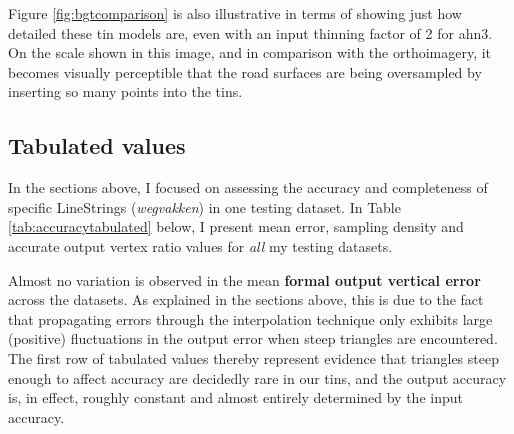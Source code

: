 Figure \ref{fig:bgtcomparison} is also illustrative in terms of showing just how detailed these \ac{tin} models are, even with an input thinning factor of 2 for \ac{ahn3}. On the scale shown in this image, and in comparison with the orthoimagery, it becomes visually perceptible that the road surfaces are being oversampled by inserting so many points into the \ac{tin}s.

\subsection{Tabulated values}
\label{sub:accuracytabulated}

In the sections above, I focused on assessing the accuracy and completeness of specific LineStrings (\textit{wegvakken}) in one testing dataset. In Table \ref{tab:accuracytabulated} below, I present mean error, sampling density and accurate output vertex ratio values for \textit{all} my testing datasets.

\begin{table}
    \caption{Tabulated 3D-NWB accuracy and completeness results per testing dataset.
    \label{tab:accuracytabulated}}
\end{table}

Almost no variation is observed in the mean \textbf{formal output vertical error} across the datasets. As explained in the sections above, this is due to the fact that propagating errors through the interpolation technique only exhibits large (positive) fluctuations in the output error when steep triangles are encountered. The first row of tabulated values thereby represent evidence that triangles steep enough to affect accuracy are decidedly rare in our \ac{tin}s, and the output accuracy is, in effect, roughly constant and almost entirely determined by the input accuracy.

